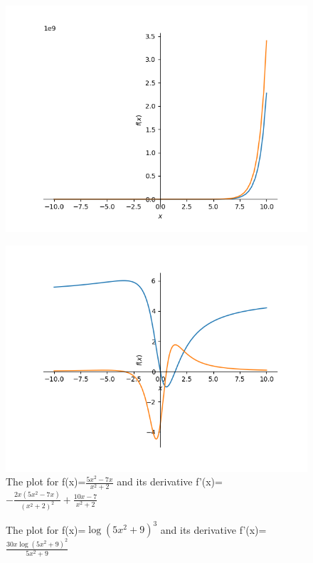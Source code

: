 \documentclass{article}
\begin{document}
\begin{figure}
\includegraphics{plot_28}
\end{figure}\begin{figure}
\caption{The plot for f(x)=$\frac{5 x^{2} - 7 x}{x^{2} + 2}$ and its derivative f'(x)=$- \frac{2 x \left(5 x^{2} - 7 x\right)}{\left(x^{2} + 2\right)^{2}} + \frac{10 x - 7}{x^{2} + 2}$}
\centering
\includegraphics{plot_29}
\end{figure}\begin{figure}
\caption{The plot for f(x)=$\log{\left(5 x^{2} + 9 \right)}^{3}$ and its derivative f'(x)=$\frac{30 x \log{\left(5 x^{2} + 9 \right)}^{2}}{5 x^{2} + 9}$}
\centering

\end{figure}
\end{document}
